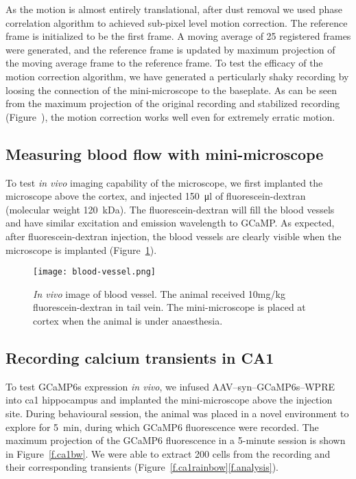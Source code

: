 As the motion is almost entirely translational, after dust removal we used phase correlation algorithm to achieved sub-pixel level motion correction. The reference frame is initialized to be the first frame. A moving average of 25 registered frames were generated, and the reference frame is updated by maximum projection of the moving average frame to the reference frame. To test the efficacy of the motion correction algorithm, we have generated a perticularly shaky recording by loosing the connection of the mini-microscope to the baseplate. As can be seen from the maximum projection of the original recording and stabilized recording (Figure~), the motion correction works well even for extremely erratic motion. 


\subsection{Measuring blood flow with mini-microscope}
To test \textit{in vivo} imaging capability of the microscope, we first implanted the microscope above the cortex, and injected \SI{150}{\ul} of fluorescein-dextran (molecular weight \SI{120}{\kilo\dalton}). The fluorescein-dextran will fill the blood vessels and have similar excitation and emission wavelength to GCaMP. As expected, after fluorescein-dextran injection, the blood vessels are clearly visible when the microscope is implanted (Figure~\ref{f.bloodvessel}).
\begin{figure}[h]
    \texttt{[image: blood-vessel.png]}
    \caption{\textit{In vivo} image of blood vessel. The animal received 10mg/kg fluorescein-dextran in tail vein. The mini-microscope is placed at cortex when the animal is under anaesthesia. \label{f.bloodvessel}}
\end{figure}


\subsection{Recording calcium transients in CA1}
To test GCaMP6s expression \textit{in vivo}, we infused AAV--syn--GCaMP6s--WPRE into \gls{ca1} hippocampus and implanted the mini-microscope above the injection site. During behavioural session, the animal was placed in a novel environment to explore for \SI{5}{\minute}, during which GCaMP6 fluorescence were recorded. The maximum projection of the GCaMP6 fluorescence in a 5-minute session is shown in Figure~\ref{f.ca1bw}. We were able to extract 200 cells from the recording and their corresponding  transients (Figure~\ref{f.ca1rainbow}\ref{f.analysis}).

